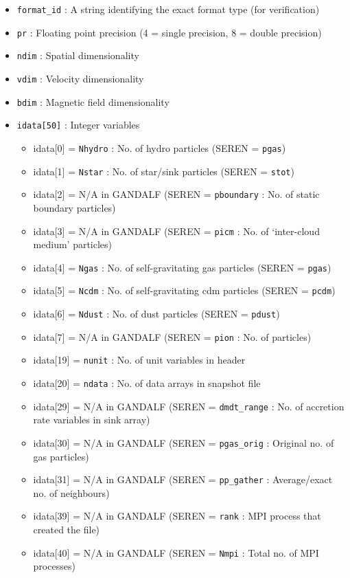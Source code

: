 \documentclass[a4paper]{article}
\newcommand{\var}[1]{\texttt{#1}}
\begin{document}
\begin{itemize}
\item \var{format\_id} : A string identifying the exact format type (for verification)
\item \var{pr} : Floating point precision (4 = single precision, 8 = double precision)
\item \var{ndim} : Spatial dimensionality
\item \var{vdim} : Velocity dimensionality
\item \var{bdim} : Magnetic field dimensionality
\item \var{idata[50]} : Integer variables
\begin{itemize}
\item idata[0] = \var{Nhydro} : No. of hydro particles (SEREN = \var{pgas})
\item idata[1] = \var{Nstar}  : No. of star/sink particles (SEREN = \var{stot})
\item idata[2] = N/A in GANDALF (SEREN = \var{pboundary} : No. of static boundary particles)
\item idata[3] = N/A in GANDALF (SEREN = \var{picm} : No. of `inter-cloud medium' particles)
\item idata[4] = \var{Ngas}  : No. of self-gravitating gas particles (SEREN = \var{pgas})
\item idata[5] = \var{Ncdm}  : No. of self-gravitating cdm particles (SEREN = \var{pcdm})
\item idata[6] = \var{Ndust} : No. of dust particles (SEREN = \var{pdust})
\item idata[7] = N/A in GANDALF (SEREN = \var{pion} : No. of  particles)
\item idata[19] = \var{nunit} : No. of unit variables in header
\item idata[20] = \var{ndata} : No. of data arrays in snapshot file
\item idata[29] = N/A in GANDALF (SEREN = \var{dmdt\_range} : No. of accretion rate variables in sink array)
\item idata[30] = N/A in GANDALF (SEREN = \var{pgas\_orig} : Original no. of gas particles)
\item idata[31] = N/A in GANDALF (SEREN = \var{pp\_gather} : Average/exact no. of neighbours)
\item idata[39] = N/A in GANDALF (SEREN = \var{rank} : MPI process that created the file)
\item idata[40] = N/A in GANDALF (SEREN = \var{Nmpi} : Total no. of MPI processes)
\end{itemize}


\end{itemize}
\end{document}
